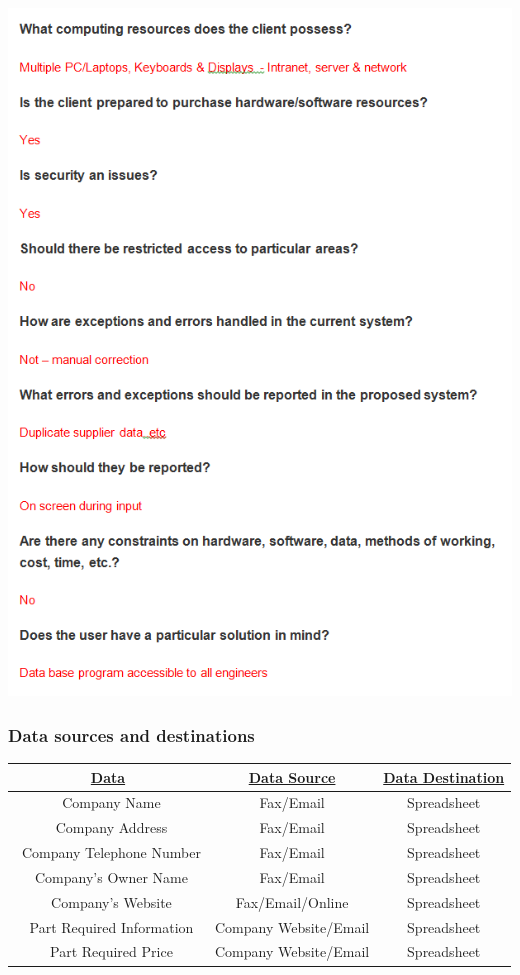 \begin{center}
\includegraphics{InterviewPart3.jpg}
\end{center}



\subsubsection{Data sources and destinations}

\begin{center}
\begin{tabular}{ |c|c|c| } 
\hline
\bf\underline{Data}                                                                                                      & \bf\underline{Data Source} & \bf\underline{Data Destination}

\\
\hline
\ Company Name & Fax/Email & Spreadsheet\\
\hline
\ Company Address & Fax/Email & Spreadsheet\\ 
\hline
\ Company Telephone Number & Fax/Email & Spreadsheet\\
\hline
\ Company's Owner Name & Fax/Email & Spreadsheet\\
\hline
\ Company's Website & Fax/Email/Online & Spreadsheet\\
\hline
\ Part Required Information & Company Website/Email & Spreadsheet\\
\hline
\ Part Required Price & Company Website/Email & Spreadsheet\\
\hline
\end{tabular}
\end{center}
